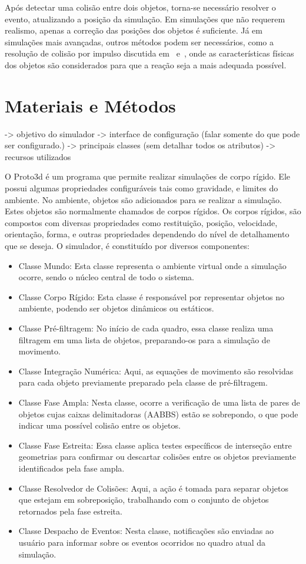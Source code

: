 \documentclass[12pt]{article}
\begin{document}
Após detectar uma colisão entre dois objetos, torna-se necessário resolver o evento, atualizando a posição da simulação. Em simulações que não requerem realismo, apenas a correção das posições dos objetos é suficiente. Já em simulações mais avançadas, outros métodos podem ser necessários, como a resolução de colisão por impulso discutida em~\cite{bourg2013physics} e~\cite{baraff1992dynamic}, onde as características físicas dos objetos são considerados para que a reação seja a mais adequada possível.

\section{Materiais e Métodos}
-> objetivo do simulador
-> interface de configuração (falar somente do que pode ser configurado.)
-> principais classes (sem detalhar todos os atributos)
-> recursos utilizados


O Proto3d é um programa que permite realizar simulações de corpo rígido.
Ele possui algumas propriedades configuráveis tais como gravidade, e limites do ambiente.
No ambiente, objetos são adicionados para se realizar a simulação. Estes objetos são normalmente chamados de corpos rígidos.
Os corpos rígidos, são compostos com diversas propriedades como restituição, posição, velocidade, orientação, forma, e outras propriedades dependendo do nível de detalhamento que se deseja.
O simulador, é constituído  por diversos componentes:

\begin{itemize}
\item Classe Mundo: Esta classe representa o ambiente virtual onde a simulação ocorre, sendo o núcleo central de todo o sistema.
\item Classe Corpo Rígido: Esta classe é responsável por representar objetos no ambiente, podendo ser objetos dinâmicos ou estáticos.
\item Classe Pré-filtragem: No início de cada quadro, essa classe realiza uma filtragem em uma lista de objetos, preparando-os para a simulação de movimento.
\item Classe Integração Numérica: Aqui, as equações de movimento são resolvidas para cada objeto previamente preparado pela classe de pré-filtragem.
\item Classe Fase Ampla: Nesta classe, ocorre a verificação de uma lista de pares de objetos cujas caixas delimitadoras (AABBS) estão se sobrepondo, o que pode indicar uma possível colisão entre os objetos.
\item Classe Fase Estreita: Essa classe aplica testes específicos de interseção entre geometrias para confirmar ou descartar colisões entre os objetos previamente identificados pela fase ampla.
\item Classe Resolvedor de Colisões: Aqui, a ação é tomada para separar objetos que estejam em sobreposição, trabalhando com o conjunto de objetos retornados pela fase estreita.
\item Classe Despacho de Eventos: Nesta classe, notificações são enviadas ao usuário para informar sobre os eventos ocorridos no quadro atual da simulação.
\end{itemize}
\end{document}
